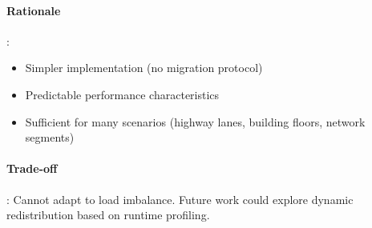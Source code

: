 \paragraph{Rationale}:
\begin{itemize}
    \item Simpler implementation (no migration protocol)
    \item Predictable performance characteristics
    \item Sufficient for many scenarios (highway lanes, building floors, network segments)
\end{itemize}

\paragraph{Trade-off}:
Cannot adapt to load imbalance. Future work could explore dynamic redistribution based on runtime profiling.
